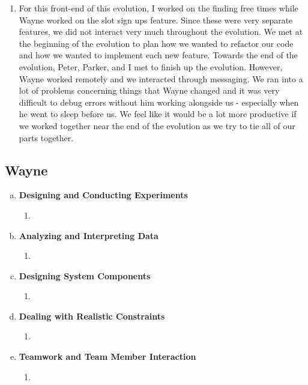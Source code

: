 \documentclass[11pt]{article}   %
\begin{document}
\begin{enumerate} [a)]
\begin{enumerate} [$\cdot$]
\item For this front-end of this evolution, I worked on the finding free times while Wayne worked on the slot sign ups feature. Since these were very separate features, we did not interact very much throughout the evolution. We met at the beginning of the evolution to plan how we wanted to refactor our code and how we wanted to implement each new feature. Towards the end of the evolution, Peter, Parker, and I met to finish up the evolution. However, Wayne worked remotely and we interacted through messaging. We ran into a lot of problems concerning things that Wayne changed and it was very difficult to debug errors without him working alongside us - especially when he went to sleep before us. We feel like it would be a lot more productive if we worked together near the end of the evolution as we try to tie all of our parts together.
\end{enumerate}
\end{enumerate}
\subsection*{Wayne}

\begin{enumerate} [a)]
\item  {\bf Designing and Conducting Experiments}
\begin{enumerate} [$\cdot$]
\item 
\end{enumerate}
\item  {\bf Analyzing and Interpreting Data}
\begin{enumerate} [$\cdot$]
\item  
\end{enumerate}
\item {\bf Designing System Components}
\begin{enumerate} [$\cdot$]
\item 
\end{enumerate}
\item {\bf Dealing with Realistic Constraints}
\begin{enumerate} [$\cdot$]
\item 
\end{enumerate}
\item  {\bf Teamwork and Team Member Interaction}
\begin{enumerate} [$\cdot$]
\item 
\end{enumerate}
\end{enumerate}
\end{document}
